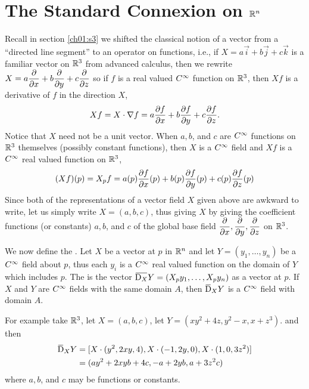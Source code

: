 \documentclass[../main]{subfiles}
\begin{document}
\section{The Standard Connexion on \texorpdfstring{$\mathbb{R}^n$}{R^n}}\label{ch02:s1}


Recall in section \ref{ch01:s3} we shifted the classical notion of a vector from a ``directed line segment'' to an operator on functions, i.e., if $X=a \vec{i}+b \vec{j}+c \vec{k}$ is a familiar vector on $\mathbb{R}^{3}$ from advanced calculus, then we rewrite $X=a\dfrac{\partial }{\partial x}+b\dfrac{\partial }{\partial y}+c\dfrac{\partial }{\partial z}$ so if $f$ is a real valued $C^\infty$ function on $\mathbb{R}^{3}$, then $X f$ is a derivative of $f$ in the direction $X$,
\[
X f=X \cdot \nabla f=a \dfrac{\partial f}{\partial x}+b \dfrac{\partial f}{\partial y}+c \dfrac{\partial f}{\partial z} .
\]
Notice that $X$ need not be a unit vector. When $a, b$, and $c$ are $C^\infty$ functions on $\mathbb{R}^{3}$ themselves (possibly constant functions), then $X$ is a $C^\infty$ field and $X f$ is a $C^\infty$ real valued function on $\mathbb{R}^{3}$,
\[
(X f)(p)=X_{p} f=a(p) \dfrac{\partial f}{\partial x}(p)+b(p) \dfrac{\partial f}{\partial y}(p)+c(p) \dfrac{\partial f}{\partial z}(p)
\]
Since both of the representations of a vector field $X$ given above are awkward to write, let us simply write $X=(a, b, c)$, thus giving $X$ by giving the coefficient functions (or constants) $a, b$, and $c$ of the global base field $\dfrac{\partial }{\partial x},\dfrac{\partial }{\partial y}, \dfrac{\partial }{\partial z}$ on $\mathbb{R}^{3}$.

We now define the . Let $X$ be a vector at $p$ in $\mathbb{R}^{n}$ and let $Y=\left(y_{1}, \ldots, y_{n}\right)$ be a $C^\infty$ field about $p$, thus each $y_{i}$ is a $C^\infty$ real valued function on the domain of $Y$ which includes $p$. The  is the vector $\xoverline{\connection_{X}} Y=\left(X_{p} y_{1}, \ldots, X_{p} y_{n}\right)$ as a vector at $p$. If $X$ and $Y$ are $C^\infty$ fields with the same domain $A$, then $\covariant_{X} Y$ is a $C^\infty$ field with domain $A$. 

For example take $\mathbb{R}^{3}$, let $X=(a, b, c)$, let  $Y=(x y^{2}+4 z, y^{2}-x,x+z^{3})$. and then
\[
\begin{aligned}
\covariant_{X} Y &=[X \cdot(y^{2}, 2 x y, 4), X \cdot(-1,2 y, 0), X \cdot(1,0,3 z^{2})] \\
&=(a y^{2}+2 x y b+4 c,-a+2 y b, a+3 z^{2} c)
\end{aligned}
\]
where $a, b$, and $c$ may be functions or constants.
\end{document}
